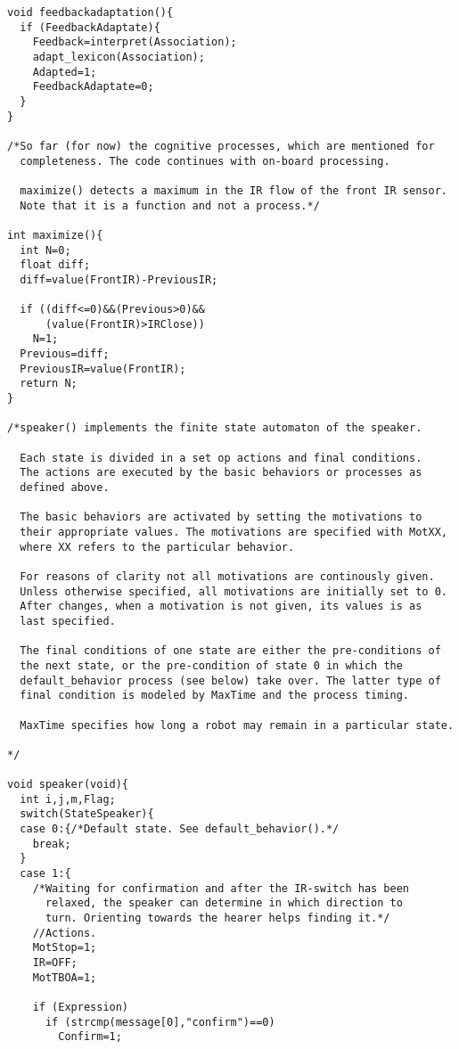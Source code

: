 \begin{lstlisting}
void feedbackadaptation(){
  if (FeedbackAdaptate){
    Feedback=interpret(Association);
    adapt_lexicon(Association);
    Adapted=1;
    FeedbackAdaptate=0;
  }
}

/*So far (for now) the cognitive processes, which are mentioned for
  completeness. The code continues with on-board processing.

  maximize() detects a maximum in the IR flow of the front IR sensor.
  Note that it is a function and not a process.*/

int maximize(){
  int N=0;
  float diff;
  diff=value(FrontIR)-PreviousIR;
  
  if ((diff<=0)&&(Previous>0)&&
      (value(FrontIR)>IRClose))
    N=1;
  Previous=diff;
  PreviousIR=value(FrontIR);
  return N;
}

/*speaker() implements the finite state automaton of the speaker.

  Each state is divided in a set op actions and final conditions.
  The actions are executed by the basic behaviors or processes as 
  defined above.

  The basic behaviors are activated by setting the motivations to 
  their appropriate values. The motivations are specified with MotXX, 
  where XX refers to the particular behavior.

  For reasons of clarity not all motivations are continously given.
  Unless otherwise specified, all motivations are initially set to 0.
  After changes, when a motivation is not given, its values is as
  last specified.

  The final conditions of one state are either the pre-conditions of
  the next state, or the pre-condition of state 0 in which the 
  default_behavior process (see below) take over. The latter type of
  final condition is modeled by MaxTime and the process timing.
  
  MaxTime specifies how long a robot may remain in a particular state.

*/

void speaker(void){
  int i,j,m,Flag;
  switch(StateSpeaker){	
  case 0:{/*Default state. See default_behavior().*/
    break;
  }
  case 1:{
    /*Waiting for confirmation and after the IR-switch has been 
      relaxed, the speaker can determine in which direction to 
      turn. Orienting towards the hearer helps finding it.*/
    //Actions.
    MotStop=1;
    IR=OFF;
    MotTBOA=1;
    
    if (Expression)
      if (strcmp(message[0],"confirm")==0)
        Confirm=1;
   

\end{lstlisting}

